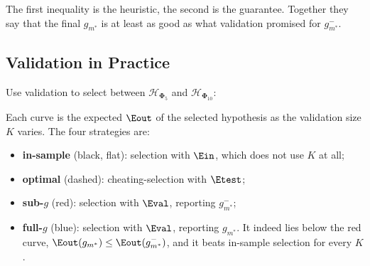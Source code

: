 The first inequality is the heuristic, the second is the guarantee. Together
they say that the final \(g_{m^*}\) is at least as good as what validation
promised for \(g_{m^*}^-\).

\subsection{Validation in Practice}

Use validation to select between \(\mathcal{H}_{\bm{\Phi}_5}\) and
\(\mathcal{H}_{\bm{\Phi}_{10}}\):

\begin{center}
\end{center}

Each curve is the expected \(\Eout\) of the selected hypothesis as the
validation size \(K\) varies. The four strategies are:
\begin{itemize}
    \item \textbf{in-sample} (black, flat): selection with \(\Ein\), which
        does not use \(K\) at all;
    \item \textbf{optimal} (dashed): cheating-selection with \(\Etest\);
    \item \textbf{sub-\(g\)} (red): selection with \(\Eval\), reporting
        \(g_{m^*}^-\);
    \item \textbf{full-\(g\)} (blue): selection with \(\Eval\), reporting
        \(g_{m^*}\). It indeed lies below the red curve, \(\Eout(g_{m^*}) \le
        \Eout(g_{m^*}^-)\), and it beats in-sample selection for every \(K\).
\end{itemize}


